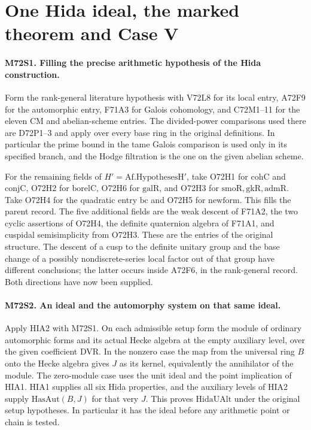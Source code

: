 \section{One Hida ideal, the marked theorem and Case V}

\paragraph{M72S1. Filling the precise arithmetic hypothesis of the Hida construction.}
Form the rank-general literature hypothesis with V72L8 for its local
entry, A72F9 for the automorphic entry, F71A3 for Galois cohomology,
and C72M1--11 for the eleven CM and abelian-scheme entries. The
divided-power comparisons used there are D72P1--3 and apply over
every base ring in the original definitions. In particular the
prime bound in the tame Galois comparison is used only in its
specified branch, and the Hodge filtration is the one on the
given abelian scheme.

For the remaining fields of $H'=\mathrm{Af.HypothesesH}'$, take
O72H1 for $\mathrm{cohC}$ and $\mathrm{conjC}$, O72H2 for
$\mathrm{borelC}$, O72H6 for $\mathrm{galR}$, and O72H3 for
$\mathrm{smoR},\mathrm{gkR},\mathrm{admR}$. Take O72H4 for the
quadratic entry $\mathrm{bc}$ and O72H5 for $\mathrm{newform}$.
This fills the parent record. The five additional fields are the
weak descent of F71A2, the two cyclic assertions of O72H4, the
definite quaternion algebra of F71A1, and cuspidal semisimplicity
from O72H3. These are the entries of the original structure.
The descent of a cusp to the definite unitary group and the
base change of a possibly nondiscrete-series local factor out of
that group have different conclusions; the latter occurs inside
A72F6, in the rank-general record. Both directions have now been
supplied.

\paragraph{M72S2. An ideal and the automorphy system on that same ideal.}
Apply HIA2 with M72S1. On each admissible setup form the module
of ordinary automorphic forms and its actual Hecke algebra at the
empty auxiliary level, over the given coefficient DVR. In the
nonzero case the map from the universal ring $B$ onto the Hecke
algebra gives $J$ as its kernel, equivalently the annihilator of
the module. The zero-module case uses the unit ideal and the
point implication of HIA1. HIA1 supplies all six Hida properties,
and the auxiliary levels of HIA2 supply $\mathrm{HasAut}(B,J)$
for that very $J$. This proves $\mathrm{HidaUAlt}$ under the
original setup hypotheses. In particular it has the ideal before
any arithmetic point or chain is tested.

